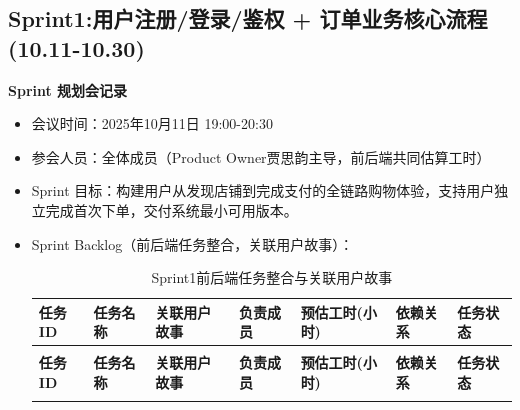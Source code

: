 \subsection{Sprint1:用户注册/登录/鉴权 + 订单业务核心流程(10.11-10.30)}
\begin{levellist}
    \item \textbf{Sprint 规划会记录}
    \begin{itemize}
        \item 会议时间：2025年10月11日 19:00-20:30
        \item 参会人员：全体成员（Product Owner贾思韵主导，前后端共同估算工时）
        \item Sprint 目标：构建用户从发现店铺到完成支付的全链路购物体验，支持用户独立完成首次下单，交付系统最小可用版本。
        \item Sprint Backlog（前后端任务整合，关联用户故事）：

              \begin{longtable}{>{\centering\arraybackslash}m{1.4cm} >{\centering\arraybackslash}m{3.1cm} >{\centering\arraybackslash}m{1.7cm} >{\centering\arraybackslash}m{1.8cm} >{\centering\arraybackslash}m{1.8cm} >{\centering\arraybackslash}m{1.3cm} >{\centering\arraybackslash}m{1.2cm}}

                  \caption{Sprint1前后端任务整合与关联用户故事} \label{tab:training}                                                                              \\

                  \toprule
                  \textbf{任务ID} & \textbf{任务名称}               & \textbf{关联用户故事} & \textbf{负责成员} & \textbf{预估工时(小时)} & \textbf{依赖关系} & \textbf{任务状态} \\
                  \midrule
                  \endfirsthead

                  \multicolumn{7}{c}{{\tablename\ \thetable{} 续表}}                                                                                  \\
                  \toprule
                  \textbf{任务ID} & \textbf{任务名称}               & \textbf{关联用户故事} & \textbf{负责成员} & \textbf{预估工时(小时)} & \textbf{依赖关系} & \textbf{任务状态} \\
                  \midrule
                  \endhead

                  \bottomrule
                  \endfoot



\end{longtable}
\end{itemize}
\end{levellist}
